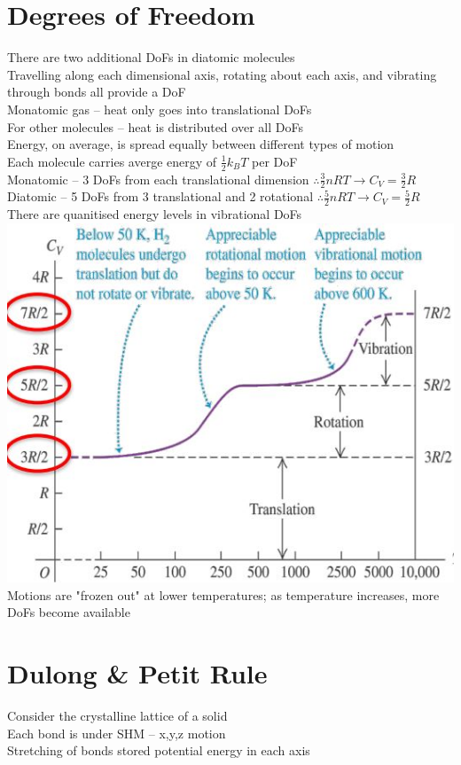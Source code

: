 \documentclass[a4paper, 11pt, normalem]{report}
\begin{document}
\section{Degrees of Freedom}
There are two additional DoFs in diatomic molecules \\
Travelling along each dimensional axis, rotating about each axis, and vibrating through bonds all provide a DoF \\
Monatomic gas -- heat only goes into translational DoFs \\
For other molecules -- heat is distributed over all DoFs \\
Energy, on average, is spread equally between different types of motion \\
Each molecule carries averge energy of $\frac{1}{2}k_{B}T$ per DoF \\
Monatomic -- 3 DoFs from each translational dimension $\therefore \frac{3}{2}nRT \rightarrow C_{V} = \frac{3}{2}R$ \\
Diatomic -- 5 DoFs from 3 translational and 2 rotational $\therefore \frac{5}{2}nRT \rightarrow C_{V} = \frac{5}{2}R$ \\
There are quanitised energy levels in vibrational DoFs \\
\includegraphics[scale=0.8]{Vibration.jpg} \\
Motions are "frozen out" at lower temperatures; as temperature increases, more DoFs become available

\section{Dulong \& Petit Rule}
Consider the crystalline lattice of a solid \\
Each bond is under SHM -- x,y,z motion \\
Stretching of bonds stored potential energy in each axis
\end{document}
